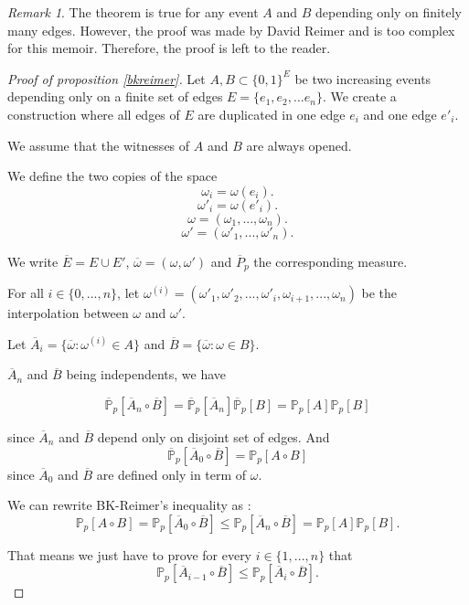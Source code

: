 \documentclass[a4paper,11pt]{article}
\theoremstyle{plain}
\theoremstyle{definition}
\theoremstyle{remark}
\newtheorem*{remark}{Remark}
\begin{document}
\begin{remark}
The theorem is true for any event $A$ and $B$ depending only on finitely many edges. However, the proof was made by David Reimer and is too complex for this memoir. Therefore, the proof is left to the reader.

\end{remark}
\begin{proof}[Proof of proposition \ref{bkreimer}]
Let $A, B \subset \{0, 1\}^E$ be two increasing events depending only on a finite set of edges $E = \{ e_1, e_2, ... e_n \}$. We create a construction where all edges of $E$ are duplicated in one edge $e_i$ and one edge $e'_i$.

We assume that the witnesses of $A$ and $B$ are always opened.

We define the two copies of the space
\[ \omega_i = \omega(e_i). \]
\[\omega'_i = \omega(e'_i).\]
\[\omega = (\omega_1, ..., \omega_n).\]
\[\omega' = (\omega'_1, ..., \omega'_n).\]

We write $\overline{E} = E \cup E'$, $\overline{\omega}=(\omega, \omega')$ and $\overline{P}_p$ the corresponding measure.

For all $i \in \{0, ..., n\}$, let $\omega^{(i)} = (\omega'_1, \omega'_2, ..., \omega'_i, \omega_{i + 1}, ..., \omega_{n})$ be the interpolation between $\omega$ and $\omega'$.

Let $\overline{A}_i = \{ \overline{\omega} : \omega^{(i)} \in A \}$ and $\overline{B} = \{ \overline{\omega} : \omega \in B \}$.

$\overline{A}_n$ and $\overline{B}$ being independents, we have

\[ \overline{\mathbb{P}}_p[\overline{A}_n \circ \overline{B}] = \overline{\mathbb{P}}_p[\overline{A}_n]\overline{\mathbb{P}}_p[B] = \mathbb{P}_p[A]\mathbb{P}_p[B]\]

since $\overline{A}_n$ and $\overline{B}$ depend only on disjoint set of edges.
And
\[ \overline{\mathbb{P}}_p[\overline{A}_0 \circ \overline{B}] = \mathbb{P}_p[A \circ B]\]
since $\overline{A}_0$ and $\overline{B}$ are defined only in term of $\omega$.

We can rewrite BK-Reimer's inequality as :
\[\mathbb{P}_p[A \circ B] = \mathbb{P}_p[\overline{A}_0 \circ \overline{B}] \leq \mathbb{P}_p[\overline{A}_n \circ \overline{B}] = \mathbb{P}_p[A]\mathbb{P}_p[B].\]

That means we just have to prove for every $i \in \{1, ..., n \}$ that
\[ \mathbb{P}_p[\overline{A}_{i - 1} \circ \overline{B}] \leq \mathbb{P}_p[\overline{A}_{i} \circ \overline{B}].\]


\end{proof}
\end{document}

